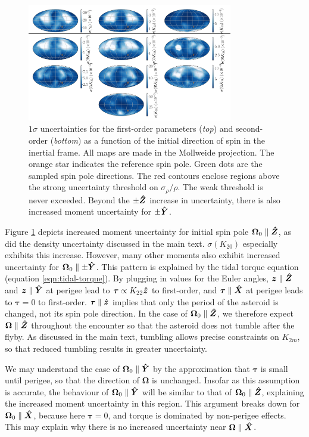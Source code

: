 \begin{figure}
  \centering
  \includegraphics[width=0.8\textwidth]{figs/spin-pole}
  \caption{$1\sigma$ uncertainties for the first-order parameters (\textit{top}) and second-order (\textit{bottom}) as a function of the initial direction of spin in the inertial frame. All maps are made in the Mollweide projection. The orange star indicates the reference spin pole. Green dots are the sampled spin pole directions. The red contours enclose regions above the strong uncertainty threshold on $\sigma_\rho / \rho$. The weak threshold is never exceeded. Beyond the $\pm \bm{\hat{Z}}$ increase in uncertainty, there is also increased moment uncertainty for $\pm \bm{\hat{Y}}$.}
  \label{fig:scan-spin}
\end{figure}

Figure \ref{fig:scan-spin} depicts increased moment uncertainty for initial spin pole $\bm \Omega_0 \parallel \bm{\hat{Z}}$, as did the density uncertainty discussed in the main text. $\sigma(K_{20})$ especially exhibits this increase. However, many other moments also exhibit increased uncertainty for $\bm \Omega_0 \parallel \pm \bm{\hat{Y}}$. This pattern is explained by the tidal torque equation (equation \ref{eqn:tidal-torque}). By plugging in values for the Euler angles, $\bm z \parallel \bm{\hat{Z}}$ and $\bm z \parallel \bm{\hat{Y}}$ at perigee lead to $\bm \tau \propto K_{22} \bm{\hat{z}}$ to first-order, and $\bm \tau \parallel \bm{\hat{X}}$ at perigee leads to $\bm \tau = 0$ to first-order. $\bm \tau \parallel \bm{\hat{z}}$ implies that only the period of the asteroid is changed, not its spin pole direction. In the case of $\bm \Omega_0 \parallel \bm{\hat{Z}}$, we therefore expect $\bm \Omega \parallel \bm{\hat{Z}}$ throughout the encounter so that the asteroid does not tumble after the flyby. As discussed in the main text, tumbling allows precise constraints on $K_{2m}$, so that reduced tumbling results in greater uncertainty.

We may understand the case of $\bm \Omega_0 \parallel \bm{\hat{Y}}$ by the approximation that $\bm \tau$ is small until perigee, so that the direction of $\bm \Omega$ is unchanged. Insofar as this assumption is accurate, the behaviour of $\bm \Omega_0 \parallel \bm{\hat{Y}}$ will be similar to that of $\bm \Omega_0 \parallel \bm{\hat{Z}}$, explaining the increased moment uncertainty in this region. This argument breaks down for $\bm \Omega_0 \parallel \bm{\hat{X}}$, because here $\bm \tau = 0$, and torque is dominated by non-perigee effects. This may explain why there is no increased uncertainty near $\bm \Omega \parallel \bm{\hat{X}}$.


